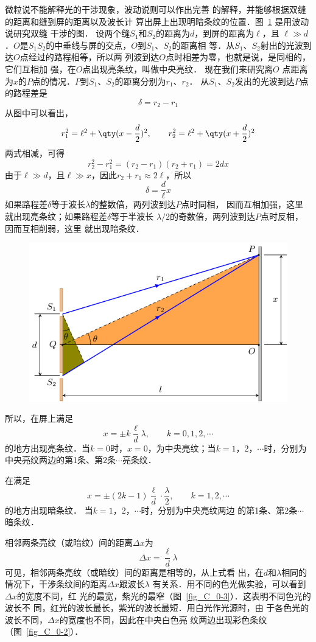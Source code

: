 微粒说不能解释光的干涉现象，波动说则可以作出完善
的解释，并能够根据双缝的距离和缝到屏的距离以及波长计
算出屏上出现明暗条纹的位置．图~\ref{fig_C_6-3} 是用波动说研究双缝
干涉的图．
设两个缝$S_1$和$S_2$的距离为$d$，到屏的距离为$\ell$，且
$\ell\gg d$．$O$是$S_1S_2$的中垂线与屏的交点，$O$到$S_1$、$S_2$的距离相
等．从$S_1$、$S_2$射出的光波到达$O$点经过的路程相等，所以两
列波到达$O$点时相差为零，也就是说，是同相的，它们互相加
强，在$O$点出现亮条纹，叫做中央亮纹．
现在我们来研究离$O$
点距离为$x$的$P$点的情况．$P$到$S_1$、$S_2$的距离分别为$r_1$、$r_2$．
从$S_1$、$S_2$发出的光波到达$P$点的路程差是
\[\delta =r_2-r_1 \]
从图中可以看出，
\[r^2_1=\ell^2+\qty(x-\frac{d}{2})^2,\qquad r^2_2=\ell^2+\qty(x+\frac{d}{2})^2  \]
两式相减，可得
\[r^2_2-r^2_1=(r_2-r_1)(r_2+r_1)=2dx\]
由于$\ell\gg d$，且$\ell\gg x$，因此$r_2+r_1\approx 2\ell$，所以
\[\delta=\frac{d}{\ell}x \]
如果路程差$\delta$等于波长$\lambda$的整数倍，两列波到达$P$点时同相，
因而互相加强，这里就出现亮条纹；如果路程差$\delta$等于半波长
$\lambda/2$的奇数倍，两列波到达$P$点时反相，因而互相削弱，这里
就出现暗条纹．
\begin{figure}[htbp]
	\centering
	\includegraphics{fig/C/6-3.pdf}
	\caption{}\label{fig_C_6-3}
\end{figure}



所以，在屏上满足
\[x=\pm k\frac{\ell}{d}\lambda, \qquad k=0,1,2,\cdots \]
的地方出现亮条纹．当$k=0$时，$x=0$，为中央亮纹；当$k=1 $，$ 
2 $，$ \cdots$时，分别为中央亮纹两边的第1条、第2条$\cdots$亮条纹．

在满足
\[x=\pm(2k-1)\frac{\ell}{d}\cdot \frac{\lambda}{2},\qquad k=1,2,\cdots \]
的地方出现暗条纹．
当$k=1 $，$ 2 $，$ \cdots$时，分别为中央亮纹两边
的第1条、第2条$\cdots$暗条纹．

相邻两条亮纹（或暗纹）间的距离$\Delta x$为
\[\Delta x=\frac{\ell}{d}\lambda \]
可见，相邻两条亮纹（或暗纹）间的距离是相等的，从上式看
出，在$d$和$\lambda$相同的情况下，干涉条纹间的距离$\Delta x$跟波长$\lambda$
有关系．用不同的色光做实验，可以看到$\Delta x$的宽度不同，红
光的最宽，紫光的最窄（图~\ref{fig_C_0-3}）．这表明不同色光的波长不
同，红光的波长最长，紫光的波长最短．用白光作光源时，由
于各色光的波长不同，$\Delta x$的宽度也不同，因此在中央白色亮
纹两边出现彩色条纹（图~\ref{fig_C_0-2}）．

